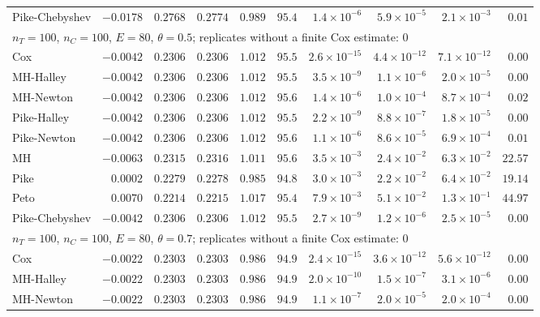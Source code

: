 \begin{landscape}
\begin{longtable}{lrrrrrrrrr}
Pike-Chebyshev & $-0.0178$ & $0.2768$ & $0.2774$ & $0.989$ & $95.4$ & $1.4 \times 10^{-6}$ & $5.9 \times 10^{-5}$ & $2.1 \times 10^{-3}$ & $0.01$ \\
\multicolumn{10}{l}{$n_T = 100$, $n_C = 100$, $E = 80$, $\theta = 0.5$; replicates without a finite Cox estimate: 0} \\
Cox & $-0.0042$ & $0.2306$ & $0.2306$ & $1.012$ & $95.5$ & $2.6 \times 10^{-15}$ & $4.4 \times 10^{-12}$ & $7.1 \times 10^{-12}$ & $0.00$ \\
MH-Halley & $-0.0042$ & $0.2306$ & $0.2306$ & $1.012$ & $95.5$ & $3.5 \times 10^{-9}$ & $1.1 \times 10^{-6}$ & $2.0 \times 10^{-5}$ & $0.00$ \\
MH-Newton & $-0.0042$ & $0.2306$ & $0.2306$ & $1.012$ & $95.6$ & $1.4 \times 10^{-6}$ & $1.0 \times 10^{-4}$ & $8.7 \times 10^{-4}$ & $0.02$ \\
Pike-Halley & $-0.0042$ & $0.2306$ & $0.2306$ & $1.012$ & $95.5$ & $2.2 \times 10^{-9}$ & $8.8 \times 10^{-7}$ & $1.8 \times 10^{-5}$ & $0.00$ \\
Pike-Newton & $-0.0042$ & $0.2306$ & $0.2306$ & $1.012$ & $95.6$ & $1.1 \times 10^{-6}$ & $8.6 \times 10^{-5}$ & $6.9 \times 10^{-4}$ & $0.01$ \\
MH & $-0.0063$ & $0.2315$ & $0.2316$ & $1.011$ & $95.6$ & $3.5 \times 10^{-3}$ & $2.4 \times 10^{-2}$ & $6.3 \times 10^{-2}$ & $22.57$ \\
Pike & $0.0002$ & $0.2279$ & $0.2278$ & $0.985$ & $94.8$ & $3.0 \times 10^{-3}$ & $2.2 \times 10^{-2}$ & $6.4 \times 10^{-2}$ & $19.14$ \\
Peto & $0.0070$ & $0.2214$ & $0.2215$ & $1.017$ & $95.4$ & $7.9 \times 10^{-3}$ & $5.1 \times 10^{-2}$ & $1.3 \times 10^{-1}$ & $44.97$ \\
Pike-Chebyshev & $-0.0042$ & $0.2306$ & $0.2306$ & $1.012$ & $95.5$ & $2.7 \times 10^{-9}$ & $1.2 \times 10^{-6}$ & $2.5 \times 10^{-5}$ & $0.00$ \\
\multicolumn{10}{l}{$n_T = 100$, $n_C = 100$, $E = 80$, $\theta = 0.7$; replicates without a finite Cox estimate: 0} \\
Cox & $-0.0022$ & $0.2303$ & $0.2303$ & $0.986$ & $94.9$ & $2.4 \times 10^{-15}$ & $3.6 \times 10^{-12}$ & $5.6 \times 10^{-12}$ & $0.00$ \\
MH-Halley & $-0.0022$ & $0.2303$ & $0.2303$ & $0.986$ & $94.9$ & $2.0 \times 10^{-10}$ & $1.5 \times 10^{-7}$ & $3.1 \times 10^{-6}$ & $0.00$ \\
MH-Newton & $-0.0022$ & $0.2303$ & $0.2303$ & $0.986$ & $94.9$ & $1.1 \times 10^{-7}$ & $2.0 \times 10^{-5}$ & $2.0 \times 10^{-4}$ & $0.00$ \\

\end{longtable}
\end{landscape}
